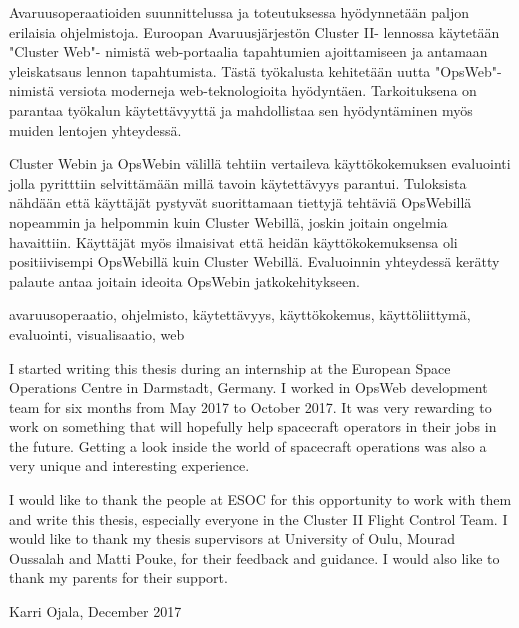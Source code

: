 \documentclass[a4paper, 12pt,titlepage]{dithesis}
\begin{document}
\begin{tiivistelma}
Avaruusoperaatioiden suunnittelussa ja toteutuksessa hyödynnetään paljon erilaisia ohjelmistoja. Euroopan Avaruusjärjestön Cluster II- lennossa käytetään "Cluster Web"- nimistä web-portaalia tapahtumien ajoittamiseen ja antamaan yleiskatsaus lennon tapahtumista. Tästä työkalusta kehitetään uutta "OpsWeb"- nimistä versiota moderneja web-teknologioita hyödyntäen. Tarkoituksena on parantaa työkalun käytettävyyttä ja mahdollistaa sen hyödyntäminen myös muiden lentojen yhteydessä.

Cluster Webin ja OpsWebin välillä tehtiin vertaileva käyttökokemuksen evaluointi jolla pyritttiin selvittämään millä tavoin käytettävyys parantui. Tuloksista nähdään että käyttäjät pystyvät suorittamaan tiettyjä tehtäviä OpsWebillä nopeammin ja helpommin kuin Cluster Webillä, joskin joitain ongelmia havaittiin. Käyttäjät myös ilmaisivat että heidän käyttökokemuksensa oli positiivisempi OpsWebillä kuin Cluster Webillä. Evaluoinnin yhteydessä kerätty palaute antaa joitain ideoita OpsWebin jatkokehitykseen.

\avainsanat avaruusoperaatio, ohjelmisto, käytettävyys, käyttökokemus, käyttöliittymä, evaluointi, visualisaatio, web
\end{tiivistelma}


\sisluettelo

I started writing this thesis during an internship at the European Space Operations Centre in Darmstadt, Germany. I worked in OpsWeb development team for six months from May 2017 to October 2017. It was very rewarding to work on something that will hopefully help spacecraft operators in their jobs in the future. Getting a look inside the world of spacecraft operations was also a very unique and interesting experience.

I would like to thank the people at ESOC for this opportunity to work with them and write this thesis, especially everyone in the Cluster II Flight Control Team. I would like to thank my thesis supervisors at University of Oulu, Mourad Oussalah and Matti Pouke, for their feedback and guidance. I would also like to thank my parents for their support.

Karri Ojala, December 2017


\setlongtables
\begin{longtable}[l]{p{3cm}p{}}



\end{longtable}
\setcounter{table}{0}
\end{document}
